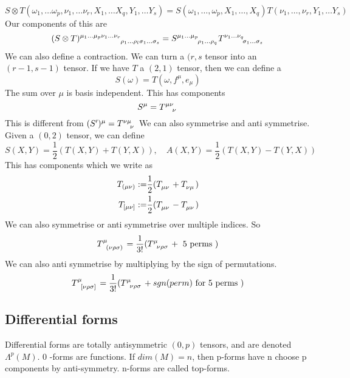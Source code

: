 \documentclass[11pt, a4paper]{article}   	%
\theoremstyle{slplain}
\begin{document}
\[
S \otimes T ( \omega_1, \dots \omega_p, \nu_1 , \dots \nu_{ r }, X_1, \dots X_q , Y_1, \dots Y_s )  = S( \omega_1 , \dots , \omega_p, X_1, \dots, X_q ) T ( \nu_1 , \dots,  \nu_r, Y_1 , \dots Y_s) 
\] 
Our components of this are 
\[
(  S\otimes T )\indices{ ^{ \mu_1 } ^{ \dots \mu_{ p }} ^{ \nu_{1 } \dots \nu_{ r }} _{ \rho_1 \dots \rho_{ l } \sigma_1 \dots \sigma _{ s}}} = S \indices{^{ \mu_1 \dots \mu_{ p}}_{ \rho_1 \dots \rho_{ q}}} T \indices{ ^{ \nu_1  \dots \nu_{ q }} _{ \sigma_{ 1} \dots \sigma_{ s}}}   
\] We can also define a contraction.
We can turn a $ ( r, s $ tensor into an  $ ( r - 1, s - 1) $ tensor. If we have
$ T $ a $ \left( 2, 1  \right) $ tensor, then we can define a 
\[
S( \omega  ) = T ( \omega  , f^\mu, e_\mu ) 
\] The sum over $ \mu $ is basis independent. 
This has components 
\[
S^\mu = T \indices{ ^\mu ^\nu _\nu }  
\] This is different from $ ( S ') ^\mu = T \indices{ ^\nu ^\mu _\nu} $ 
We can also symmetrise and anti symmetrise. Given a $ ( 0 , 2 ) $ tensor, 
we can define 
\[
S( X, Y ) = \frac{1}{ 2 } ( T ( X, Y ) + T ( Y , X) ), \quad A( X, Y ) = \frac{1}{2 } ( T ( X, Y ) - T ( Y , X) ) 
\] This has components which we write as 
\begin{align*}
T_{ ( \mu \nu ) } : = & \frac{1}{2 } ( T \indices{ _\mu_\nu} + T \indices{ _\nu_\mu} ) \\
T_{ [ \mu \nu ] } : = & \frac{1}{2 } ( T \indices{ _\mu_\nu} - T \indices{ _\mu_\nu}) 
\end{align*}
We can also symmetrise or anti symmetrise over multiple indices. 
So 
\[
T \indices{ ^\mu _{ ( \nu \rho \sigma  )  }}  = \frac{1}{ 3 ! } ( T \indices{^\mu _\nu _\rho _\sigma } + \text{ 5 perms } )  
\] We can also anti symmetrise by multiplying by the sign of permutations. 
\[
T \indices{ ^\mu _{ [  \nu \rho \sigma  ]   }}  = \frac{1}{ 3 ! } ( T \indices{^\mu _\nu _\rho _\sigma } + sgn ( perm)  \text{ for 5 perms } )
\]

\pagebreak
\subsection{Differential forms} 
Differential forms are totally antisymmetric $ ( 0 , p )  $ tensors, and are denoted $ \Lambda^ p ( M ) $. 
0 -forms are functions. If  $ dim ( M )  = n$, then p-forms have n choose p components by anti-symmetry. 
n-forms are called top-forms. 
\end{document}
